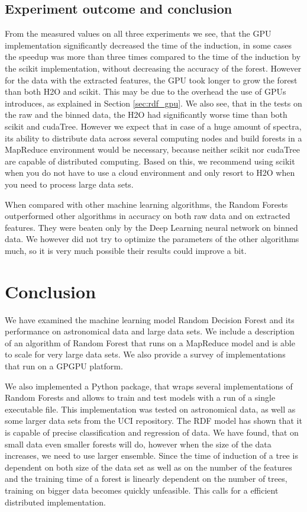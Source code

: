 \documentclass[thesis=B,english]{FITthesis}[2012/10/20]
\begin{document}
\section{Experiment outcome and conclusion}
From the measured values on all three experiments we see, that the GPU implementation significantly decreased the time of the induction, in some cases the speedup was more than three times compared to the time of the induction by the scikit implementation, without decreasing the accuracy of the forest. However for the data with the extracted features, the GPU took longer to grow the forest than both H2O and scikit. This may be due to the overhead the use of GPUs introduces, as explained in Section \ref{sec:rdf_gpu}. We also see, that in the tests on the raw and the binned data, the H2O had significantly worse time than both scikit and cudaTree. However we expect that in case of a huge amount of spectra, its ability to distribute data across several computing nodes and build forests in a MapReduce environment would be necessary, because neither scikit nor cudaTree are capable of distributed computing. Based on this, we recommend using scikit when you do not have to use a cloud environment and only resort to H2O when you need to process large data sets.

When compared with other machine learning algorithms, the Random Forests outperformed other algorithms in accuracy on both raw data and on extracted features. They were beaten only by the Deep Learning neural network on binned data. We however did not try to optimize the parameters of the other algorithms much, so it is very much possible their results could improve a bit. 
\chapter{Conclusion}
We have examined the machine learning model Random Decision Forest and its performance on astronomical data and large data sets. We include a description of an algorithm of Random Forest that runs on a MapReduce model and is able to scale for very large data sets. We also provide a survey of implementations that run on a GPGPU platform.

We also implemented a Python package, that wraps several implementations of Random Forests and allows to train and test models with a run of a single executable file. This implementation was tested on astronomical data, as well as some larger data sets from the UCI repository. The RDF model has shown that it is capable of precise classification and regression of data. We have found, that on small data even smaller forests will do, however when the size of the data increases, we need to use larger ensemble. Since the time of induction of a tree is dependent on both size of the data set as well as on the number of the features and the training time of a forest is linearly dependent on the number of trees, training on bigger data becomes quickly unfeasible. This calls for a efficient distributed implementation.
\end{document}
